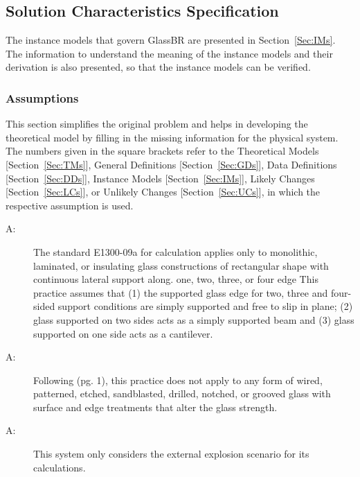 \documentclass[12pt]{article}
\newcounter{assumpnum}
\newcommand{\atheassumpnum}{A\theassumpnum}
\begin{document}
\subsection{Solution Characteristics Specification}
\label{Sec:SolCharSpec}
The instance models that govern GlassBR are presented in Section~\ref{Sec:IMs}. The information to understand the meaning of the instance models and their derivation is also presented, so that the instance models can be verified.
\subsubsection{Assumptions}
\label{Sec:Assumps}
This section simplifies the original problem and helps in developing the theoretical model by filling in the missing information for the physical system. The numbers given in the square brackets refer to the Theoretical Models {[}Section~\ref{Sec:TMs}{]}, General Definitions {[}Section~\ref{Sec:GDs}{]}, Data Definitions {[}Section~\ref{Sec:DDs}{]}, Instance Models {[}Section~\ref{Sec:IMs}{]}, Likely Changes {[}Section~\ref{Sec:LCs}{]}, or Unlikely Changes {[}Section~\ref{Sec:UCs}{]}, in which the respective assumption is used.
\begin{description}
\item[\atheassumpnum\label{A:glassTyA}:]The standard E1300-09a for calculation applies only to monolithic, laminated, or insulating glass constructions of rectangular shape with continuous lateral support along. one, two, three, or four edge This practice assumes that (1) the supported glass edge for two, three and four-sided support conditions are simply supported and free to slip in plane; (2) glass supported on two sides acts as a simply supported beam and (3) glass supported on one side acts as a cantilever.
\end{description}
\begin{description}
\item[\atheassumpnum\label{A:glassConditionA}:]Following \cite{astm2009} (pg. 1), this practice does not apply to any form of wired, patterned, etched, sandblasted, drilled, notched, or grooved glass with surface and edge treatments that alter the glass strength.
\end{description}
\begin{description}
\item[\atheassumpnum\label{A:explsnScenarioA}:]This system only considers the external explosion scenario for its calculations.
\end{description}
\end{document}
